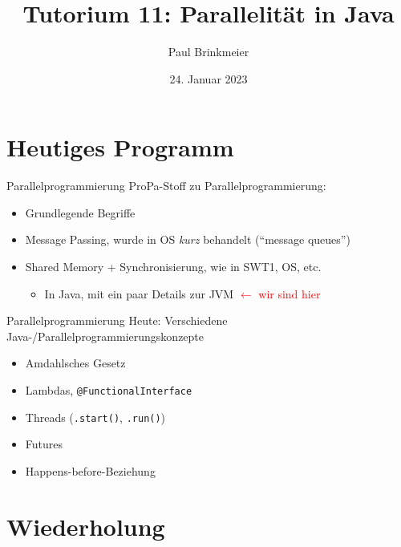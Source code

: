 \documentclass{beamer}
\title{Tutorium 11: Parallelität in Java}
\author{Paul Brinkmeier}
\institute{Tutorium Programmierparadigmen am KIT}
\date{24. Januar 2023}
\begin{document}
\begin{frame}
	\titlepage
\end{frame}

\section{Heutiges Programm}

\begin{frame}{Parallelprogrammierung}
	ProPa-Stoff zu Parallelprogrammierung:

	\begin{itemize}
		\item Grundlegende Begriffe
		\item Message Passing, wurde in OS \emph{kurz} behandelt (\enquote{message queues})
		\item Shared Memory + Synchronisierung, wie in SWT1, OS, etc.
		\begin{itemize}
                  \item In Java, mit ein paar Details zur JVM \textcolor{red}{$\leftarrow$ wir sind hier}
		\end{itemize}
	\end{itemize}
\end{frame}

\begin{frame}{Parallelprogrammierung}
  Heute: Verschiedene Java-/Parallelprogrammierungskonzepte

  \begin{itemize}
    \item Amdahlsches Gesetz
    \item Lambdas, \texttt{@FunctionalInterface}
    \item Threads (\texttt{.start()}, \texttt{.run()})
    \item Futures
    \item Happens-before-Beziehung
  \end{itemize}
\end{frame}

\section{Wiederholung}
\end{document}
